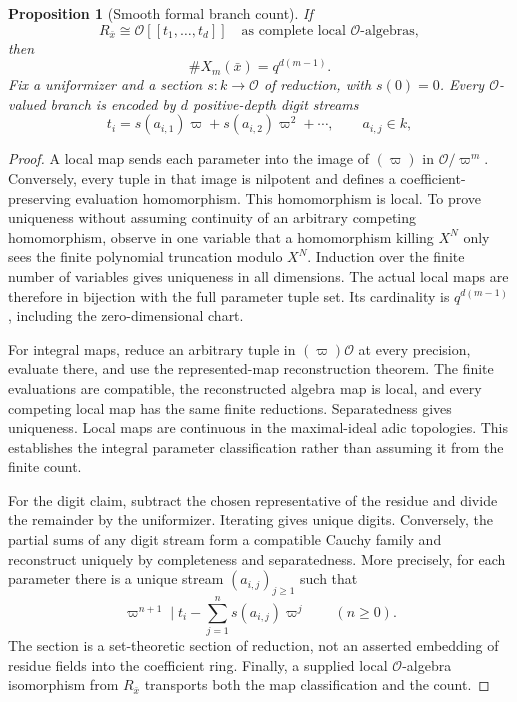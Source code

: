 \documentclass[11pt]{article}
\newtheorem{proposition}[theorem]{Proposition}
\theoremstyle{definition}
\theoremstyle{remark}
\newcommand{\Ocal}{\mathcal O}
\begin{document}
\begin{proposition}[Smooth formal branch count]
If
\[
R_{\bar x}\cong\Ocal[[t_1,\ldots,t_d]]\quad\text{as complete local }\Ocal\text{-algebras},
\]
then
\[
\boxed{
\#X_m(\bar x)=q^{d(m-1)}.
}
\]
Fix a uniformizer and a section \(s:k\to\Ocal\) of reduction, with \(s(0)=0\). Every \(\Ocal\)-valued branch is encoded by \(d\) positive-depth digit streams
\[
t_i=s(a_{i,1})\varpi+s(a_{i,2})\varpi^2+\cdots,
\qquad a_{i,j}\in k,
\]
\end{proposition}

\begin{proof}
A local map sends each parameter into the image of \((\varpi)\) in \(\Ocal/\varpi^m\). Conversely, every tuple in that image is nilpotent and defines a coefficient-preserving evaluation homomorphism. This homomorphism is local. To prove uniqueness without assuming continuity of an arbitrary competing homomorphism, observe in one variable that a homomorphism killing \(X^N\) only sees the finite polynomial truncation modulo \(X^N\). Induction over the finite number of variables gives uniqueness in all dimensions. The actual local maps are therefore in bijection with the full parameter tuple set. Its cardinality is \(q^{d(m-1)}\), including the zero-dimensional chart.

For integral maps, reduce an arbitrary tuple in \((\varpi)\Ocal\) at every precision, evaluate there, and use the represented-map reconstruction theorem. The finite evaluations are compatible, the reconstructed algebra map is local, and every competing local map has the same finite reductions. Separatedness gives uniqueness. Local maps are continuous in the maximal-ideal adic topologies. This establishes the integral parameter classification rather than assuming it from the finite count.

For the digit claim, subtract the chosen representative of the residue and divide the remainder by the uniformizer. Iterating gives unique digits. Conversely, the partial sums of any digit stream form a compatible Cauchy family and reconstruct uniquely by completeness and separatedness. More precisely, for each parameter there is a unique stream \((a_{i,j})_{j\ge1}\) such that
\[
\varpi^{n+1}\mid t_i-\sum_{j=1}^{n}s(a_{i,j})\varpi^j\qquad(n\ge0).
\]
The section is a set-theoretic section of reduction, not an asserted embedding of residue fields into the coefficient ring. Finally, a supplied local \(\Ocal\)-algebra isomorphism from \(R_{\bar x}\) transports both the map classification and the count.
\end{proof}
\end{document}
